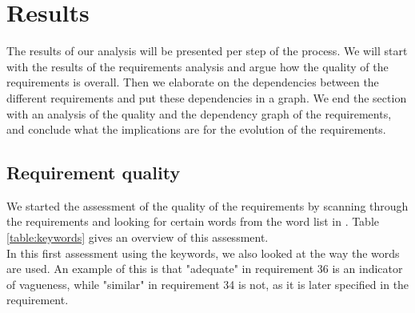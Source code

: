 \documentclass[a4paper,11pt]{article}
\begin{document}
	\section{Results}
		The results of our analysis will be presented per step of the process. We will start with the results of the requirements analysis and argue how the quality of the requirements is overall. Then we elaborate on the dependencies between the different requirements and put these dependencies in a graph. We end the section with an analysis of the quality and the dependency graph of the requirements, and conclude what the implications are for the evolution of the requirements. \\
		\subsection{Requirement quality}
			We started the assessment of the quality of the requirements by scanning through the requirements and looking for certain words from the word list in \cite{keywords}. Table \ref{table:keywords} gives an overview of this assessment. \\
			In this first assessment using the keywords, we also looked at the way the words are used. An example of this is that "adequate" in requirement 36 is an indicator of vagueness, while "similar" in requirement 34 is not, as it is later specified in the requirement. \\
\end{document}
